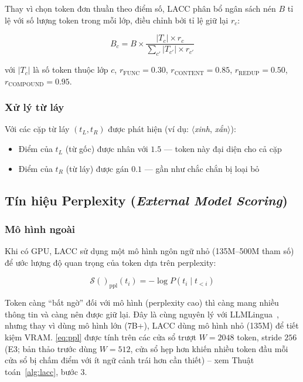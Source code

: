 \documentclass[12pt,a4paper]{article}
\newcommand{\score}[1]{\mathcal{S}(#1)}      %
\newcommand{\method}[1]{\textsc{#1}}         %
\newcommand{\viet}[1]{\textit{#1}}           %
\begin{document}
Thay vì chọn token đơn thuần theo điểm số, \method{LACC} phân bổ ngân sách nén $B$ tỉ lệ với số lượng token trong mỗi lớp, điều chỉnh bởi tỉ lệ giữ lại $r_c$:

\begin{equation}\label{eq:budget}
    B_c = B \times \frac{|T_c| \times r_c}{\sum_{c'} |T_{c'}| \times r_{c'}}
\end{equation}

với $|T_c|$ là số token thuộc lớp $c$, $r_{\text{FUNC}} = 0.30$, $r_{\text{CONTENT}} = 0.85$, $r_{\text{REDUP}} = 0.50$, $r_{\text{COMPOUND}} = 0.95$.

\subsubsection{Xử lý từ láy}

Với các cặp từ láy $(t_L, t_R)$ được phát hiện (ví dụ: $\langle$\viet{xinh}, \viet{xắn}$\rangle$):
\begin{itemize}
    \item Điểm của $t_L$ (từ gốc) được nhân với $1.5$ --- token này đại diện cho cả cặp
    \item Điểm của $t_R$ (từ láy) được gán $0.1$ --- gần như chắc chắn bị loại bỏ
\end{itemize}

\subsection{Tín hiệu Perplexity (\textit{External Model Scoring})}

\subsubsection{Mô hình ngoài}

Khi có GPU, \method{LACC} sử dụng một mô hình ngôn ngữ nhỏ (135M--500M tham số) để ước lượng độ quan trọng của token dựa trên perplexity:

\begin{equation}\label{eq:ppl}
    \score{}_{\text{ppl}}(t_i) = -\log P(t_i \mid t_{<i})
\end{equation}

Token càng ``bất ngờ'' đối với mô hình (perplexity cao) thì càng mang nhiều thông tin và càng nên được giữ lại. Đây là cùng nguyên lý với LLMLingua~\cite{jiang2023llmlingua}, nhưng thay vì dùng mô hình lớn (7B+), \method{LACC} dùng mô hình nhỏ (135M) để tiết kiệm VRAM. \eqref{eq:ppl} được tính trên các cửa sổ trượt $W{=}2048$ token, stride $256$ (E3; bản thảo trước dùng $W{=}512$, cửa sổ hẹp hơn khiến nhiều token đầu mỗi cửa sổ bị chấm điểm với ít ngữ cảnh trái hơn cần thiết) -- xem Thuật toán~\ref{alg:lacc}, bước 3.
\end{document}
